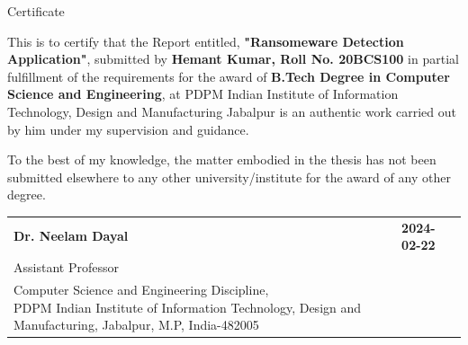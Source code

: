 \documentclass[12pt,letterpaper]{article}
\begin{document}
\newpage
    \begin{center}
        \vspace*{1cm}
        {\englishtowne \LARGE Certificate}
        
        \vspace{1.2cm}
        
       \large This is to certify that the Report entitled, \textbf{"Ransomeware Detection Application"}, submitted by \textbf{Hemant Kumar, Roll No. 20BCS100} in partial fulfillment of the requirements for the award of \textbf{ B.Tech Degree in Computer Science and Engineering}, at PDPM Indian Institute of Information Technology, Design and Manufacturing Jabalpur is an authentic work carried out by him under my supervision and guidance.
    
    
        To the best of my knowledge, the matter embodied in the thesis has not been submitted elsewhere to any other university/institute for the award of any other degree.
        
        \vfill %

         
    \noindent
    \begin{tabular}{@{}ll@{}}
        \textbf{Dr. Neelam Dayal} & \hfill\textbf{{{2024-02-22}}} \\
        \large Assistant Professor & \\
        \parbox[t]{0.7\textwidth}{%
            Computer Science and Engineering Discipline, \\
            PDPM Indian Institute of Information Technology, Design and Manufacturing, Jabalpur, M.P, India-482005
        }
    \end{tabular}



       \vspace{2cm}
        
    \end{center}
    
\end{document}
